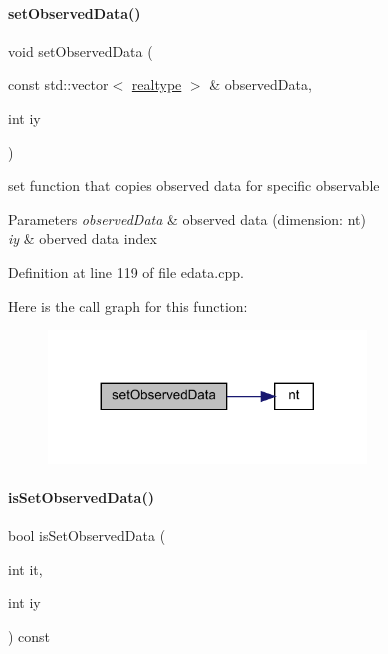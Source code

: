\paragraph{\texorpdfstring{set\+Observed\+Data()}{setObservedData()}\hspace{0.1cm}{\footnotesize\ttfamily [2/2]}}
{\footnotesize\ttfamily void set\+Observed\+Data (\begin{DoxyParamCaption}\item[{const std\+::vector$<$ \mbox{\hyperlink{namespaceamici_a1bdce28051d6a53868f7ccbf5f2c14a3}{realtype}} $>$ \&}]{observed\+Data,  }\item[{int}]{iy }\end{DoxyParamCaption})}

set function that copies observed data for specific observable


\begin{DoxyParams}{Parameters}
{\em observed\+Data} & observed data (dimension\+: nt) \\
\hline
{\em iy} & oberved data index \\
\hline
\end{DoxyParams}


Definition at line 119 of file edata.\+cpp.

Here is the call graph for this function\+:
\nopagebreak
\begin{figure}[H]
\begin{center}
\leavevmode
\includegraphics[width=239pt]{classamici_1_1_exp_data_a814827d61da6c675276758c856faf794_cgraph}
\end{center}
\end{figure}
\mbox{\label{classamici_1_1_exp_data_aedcda756b6356d6e147f2f4eb7658500}} 
\paragraph{\texorpdfstring{is\+Set\+Observed\+Data()}{isSetObservedData()}}
{\footnotesize\ttfamily bool is\+Set\+Observed\+Data (\begin{DoxyParamCaption}\item[{int}]{it,  }\item[{int}]{iy }\end{DoxyParamCaption}) const}

